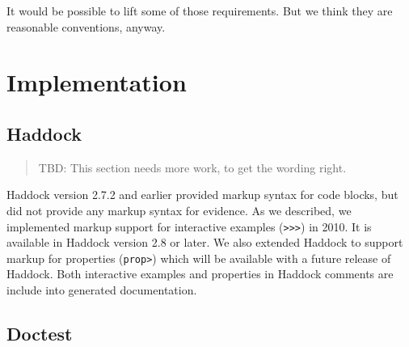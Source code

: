 \documentclass[preprint]{sigplanconf}
\begin{document}
\noindent It would be possible to lift some of those requirements.
But we think they are reasonable conventions, anyway.


\section{Implementation}

\subsection{Haddock}

\begin{quote}
    TBD: This section needs more work, to get the wording right.
\end{quote}

Haddock version 2.7.2 and earlier provided markup syntax for
code blocks, but did not provide any markup syntax for evidence.
As we described, we implemented markup support for interactive examples ({\tt >>>}) in 2010.
It is available in Haddock version 2.8 or later.
We also extended Haddock to support markup for properties ({\tt prop>}) which
will be available with a future release of Haddock.
Both interactive examples and properties in Haddock comments are
include into generated documentation.




\subsection{Doctest}
\label{sec:doctest}
\end{document}
